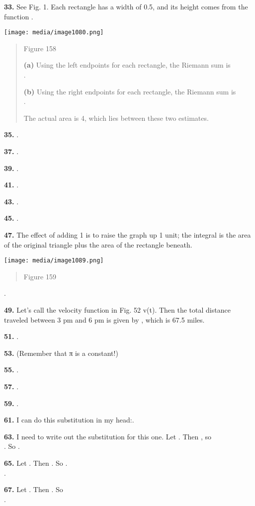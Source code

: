 \textbf{33.} See Fig. 1. Each rectangle has a width of 0.5, and its
height comes from the function .

\texttt{[image: media/image1080.png]}

\begin{quote}
Figure 158

\textbf{(a)} Using the left endpoints for each rectangle, the Riemann
sum is\\
.

\textbf{(b)} Using the right endpoints for each rectangle, the Riemann
sum is\\
.

The actual area is 4, which lies between these two estimates.
\end{quote}

\textbf{35.} .

\textbf{37.} .

\textbf{39.} .

\textbf{41.} .

\textbf{43.} .

\textbf{45.} .

\textbf{47.} The effect of adding 1 is to raise the graph up 1 unit; the
integral is the area of the original triangle plus the area of the
rectangle beneath.

\texttt{[image: media/image1089.png]}

\begin{quote}
Figure 159
\end{quote}

.

\textbf{49.} Let's call the velocity function in Fig. 52 v(t). Then the
total distance traveled between 3 pm and 6 pm is given by , which is
67.5 miles.

\textbf{51.} .

\textbf{53.} (Remember that π is a constant!)

\textbf{55.} .

\textbf{57.} .

\textbf{59.} .

\textbf{61.} I can do this substitution in my head:.

\textbf{63.} I need to write out the substitution for this one. Let .
Then , so\\
. So .

\textbf{65.} Let . Then . So .\\
.

\textbf{67.} Let . Then . So\\
.

